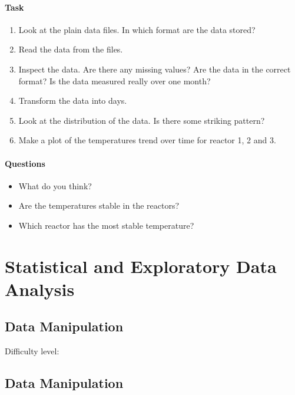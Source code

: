 \documentclass[
  letterpaper,
  DIV=11,
  numbers=noendperiod]{scrreprt}
\providecommand{\tightlist}{%
  \setlength{\itemsep}{0pt}\setlength{\parskip}{0pt}}\usepackage{longtable,booktabs,array}
\begin{document}
\subsection{Task}\label{task}

\begin{enumerate}
\def\labelenumi{\arabic{enumi}.}
\setcounter{enumi}{-1}
\tightlist
\item
  Look at the plain data files. In which format are the data stored?
\item
  Read the data from the files.
\item
  Inspect the data. Are there any missing values? Are the data in the
  correct format? Is the data measured really over one month?
\item
  Transform the data into days.
\item
  Look at the distribution of the data. Is there some striking pattern?
\item
  Make a plot of the temperatures trend over time for reactor 1, 2 and
  3.
\end{enumerate}

\subsection{Questions}\label{questions}

\begin{itemize}
\tightlist
\item
  What do you think?
\item
  Are the temperatures stable in the reactors?
\item
  Which reactor has the most stable temperature?
\end{itemize}

\part{Statistical and Exploratory Data Analysis}

\chapter{Data Manipulation}\label{data-manipulation}

Difficulty level: { }

\chapter*{Data Manipulation}\label{data-manipulation-1}
\end{document}
